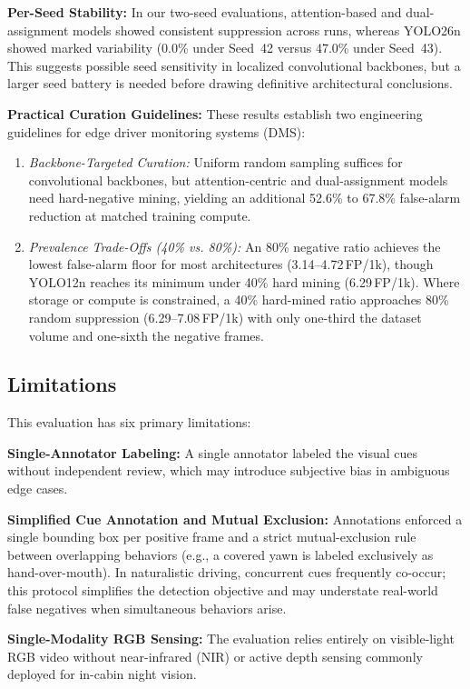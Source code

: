 \documentclass[conference]{IEEEtran}
\begin{document}
\textbf{Per-Seed Stability:} In our two-seed evaluations, attention-based and dual-assignment models showed consistent suppression across runs, whereas YOLO26n showed marked variability (0.0\% under Seed~42 versus 47.0\% under Seed~43). This suggests possible seed sensitivity in localized convolutional backbones, but a larger seed battery is needed before drawing definitive architectural conclusions.

\textbf{Practical Curation Guidelines:} These results establish two engineering guidelines for edge driver monitoring systems (DMS):
\begin{enumerate}
    \item \textit{Backbone-Targeted Curation:} Uniform random sampling suffices for convolutional backbones, but attention-centric and dual-assignment models need hard-negative mining, yielding an additional 52.6\% to 67.8\% false-alarm reduction at matched training compute.
    \item \textit{Prevalence Trade-Offs (40\% vs. 80\%):} An 80\% negative ratio achieves the lowest false-alarm floor for most architectures (3.14--4.72\,FP/1k), though YOLO12n reaches its minimum under 40\% hard mining (6.29\,FP/1k). Where storage or compute is constrained, a 40\% hard-mined ratio approaches 80\% random suppression (6.29--7.08\,FP/1k) with only one-third the dataset volume and one-sixth the negative frames.
\end{enumerate}

\subsection{Limitations}
\label{subsec:limitations}
This evaluation has six primary limitations:

\textbf{Single-Annotator Labeling:} A single annotator labeled the visual cues without independent review, which may introduce subjective bias in ambiguous edge cases.

\textbf{Simplified Cue Annotation and Mutual Exclusion:} Annotations enforced a single bounding box per positive frame and a strict mutual-exclusion rule between overlapping behaviors (e.g., a covered yawn is labeled exclusively as hand-over-mouth). In naturalistic driving, concurrent cues frequently co-occur; this protocol simplifies the detection objective and may understate real-world false negatives when simultaneous behaviors arise.

\textbf{Single-Modality RGB Sensing:} The evaluation relies entirely on visible-light RGB video without near-infrared (NIR) or active depth sensing commonly deployed for in-cabin night vision.
\end{document}
